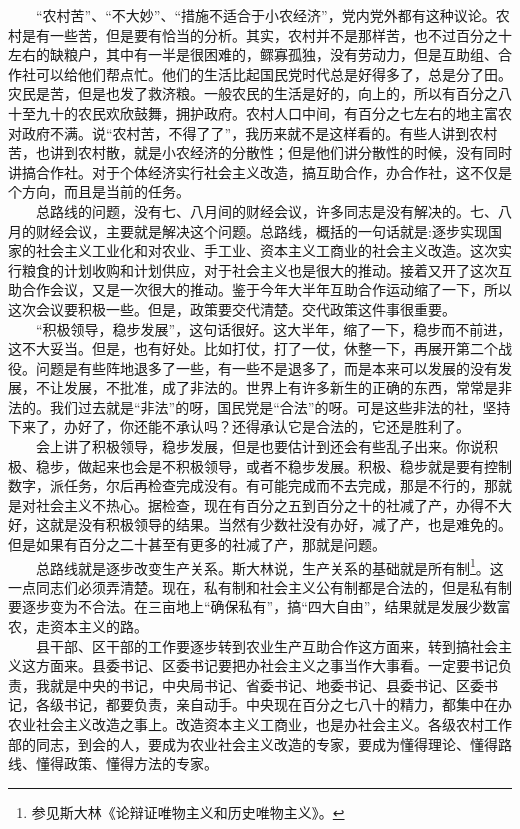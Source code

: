 \documentclass[cn,11pt,chinese]{elegantbook}
\begin{document}
　　“农村苦”、“不大妙”、“措施不适合于小农经济”，党内党外都有这种议论。农村是有一些苦，但是要有恰当的分析。其实，农村并不是那样苦，也不过百分之十左右的缺粮户，其中有一半是很困难的，鳏寡孤独，没有劳动力，但是互助组、合作社可以给他们帮点忙。他们的生活比起国民党时代总是好得多了，总是分了田。灾民是苦，但是也发了救济粮。一般农民的生活是好的，向上的，所以有百分之八十至九十的农民欢欣鼓舞，拥护政府。农村人口中间，有百分之七左右的地主富农对政府不满。说“农村苦，不得了了”，我历来就不是这样看的。有些人讲到农村苦，也讲到农村散，就是小农经济的分散性；但是他们讲分散性的时候，没有同时讲搞合作社。对于个体经济实行社会主义改造，搞互助合作，办合作社，这不仅是个方向，而且是当前的任务。\\
　　总路线的问题，没有七、八月间的财经会议，许多同志是没有解决的。七、八月的财经会议，主要就是解决这个问题。总路线，概括的一句话就是:逐步实现国家的社会主义工业化和对农业、手工业、资本主义工商业的社会主义改造。这次实行粮食的计划收购和计划供应，对于社会主义也是很大的推动。接着又开了这次互助合作会议，又是一次很大的推动。鉴于今年大半年互助合作运动缩了一下，所以这次会议要积极一些。但是，政策要交代清楚。交代政策这件事很重要。\\
　　“积极领导，稳步发展”，这句话很好。这大半年，缩了一下，稳步而不前进，这不大妥当。但是，也有好处。比如打仗，打了一仗，休整一下，再展开第二个战役。问题是有些阵地退多了一些，有一些不是退多了，而是本来可以发展的没有发展，不让发展，不批准，成了非法的。世界上有许多新生的正确的东西，常常是非法的。我们过去就是“非法”的呀，国民党是“合法”的呀。可是这些非法的社，坚持下来了，办好了，你还能不承认吗？还得承认它是合法的，它还是胜利了。\\
　　会上讲了积极领导，稳步发展，但是也要估计到还会有些乱子出来。你说积极、稳步，做起来也会是不积极领导，或者不稳步发展。积极、稳步就是要有控制数字，派任务，尔后再检查完成没有。有可能完成而不去完成，那是不行的，那就是对社会主义不热心。据检查，现在有百分之五到百分之十的社减了产，办得不大好，这就是没有积极领导的结果。当然有少数社没有办好，减了产，也是难免的。但是如果有百分之二十甚至有更多的社减了产，那就是问题。\\
　　总路线就是逐步改变生产关系。斯大林说，生产关系的基础就是所有制\footnote[1]{ 参见斯大林《论辩证唯物主义和历史唯物主义》。}。这一点同志们必须弄清楚。现在，私有制和社会主义公有制都是合法的，但是私有制要逐步变为不合法。在三亩地上“确保私有”，搞“四大自由”，结果就是发展少数富农，走资本主义的路。\\
　　县干部、区干部的工作要逐步转到农业生产互助合作这方面来，转到搞社会主义这方面来。县委书记、区委书记要把办社会主义之事当作大事看。一定要书记负责，我就是中央的书记，中央局书记、省委书记、地委书记、县委书记、区委书记，各级书记，都要负责，亲自动手。中央现在百分之七八十的精力，都集中在办农业社会主义改造之事上。改造资本主义工商业，也是办社会主义。各级农村工作部的同志，到会的人，要成为农业社会主义改造的专家，要成为懂得理论、懂得路线、懂得政策、懂得方法的专家。\\
\end{document}
